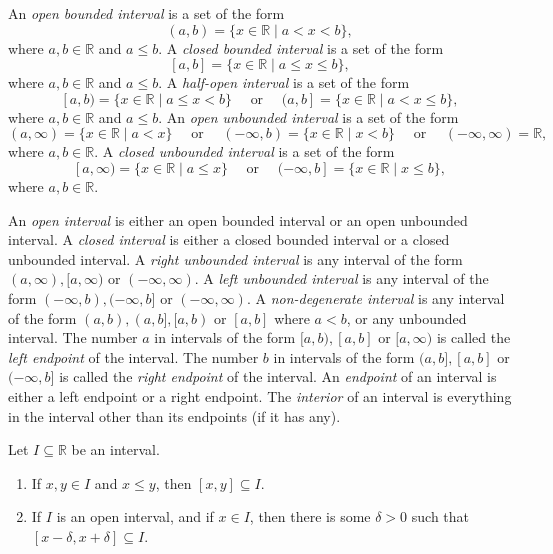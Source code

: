 \begin{definition} %
	An \emph{open bounded interval} is a set of the form
	$$
		(a, b) = \{ x \in \mathbb{R} \mid a < x < b \},
	$$
	where $a, b \in \mathbb{R}$ and $a \leq b$. A \emph{closed bounded interval} is a set of the form
	$$
		[a, b] = \{ x \in \mathbb{R} \mid a \leq x \leq b \},
	$$
	where $a, b \in \mathbb{R}$ and $a \leq b$. A \emph{half-open interval} is a set of the form
	$$
		[a, b) = \{ x \in \mathbb{R} \mid a \leq x < b \} \quad \text { or } \quad (a, b] = \{ x \in \mathbb{R} \mid a < x \leq b \},
	$$
	where $a, b \in \mathbb{R}$ and $a \leq b$. An \emph{open unbounded interval} is a set of the form
	$$
		(a, \infty) = \{ x \in \mathbb{R} \mid a < x \} \quad \text { or } \quad (-\infty, b) = \{ x \in \mathbb{R} \mid x < b \} \quad \text { or } \quad (-\infty, \infty) = \mathbb{R},
	$$
	where $a, b \in \mathbb{R}$. A \emph{closed unbounded interval} is a set of the form
	$$
		[a, \infty) = \{ x \in \mathbb{R} \mid a \leq x \} \quad \text { or } \quad(-\infty, b] = \{ x \in \mathbb{R} \mid x \leq b \},
	$$
	where $a, b \in \mathbb{R}$.

	An \emph{open interval} is either an open bounded interval or an open unbounded interval. A \emph{closed interval} is either a closed bounded interval or a closed unbounded interval. A \emph{right unbounded interval} is any interval of the form $(a, \infty), [a, \infty)$ or $(-\infty, \infty)$. A \emph{left unbounded interval} is any interval of the form $(-\infty, b), (-\infty, b]$ or $(-\infty, \infty)$. A \emph{non-degenerate interval} is any interval of the form $(a, b), (a, b], [a, b)$ or $[a, b]$ where $a < b$, or any unbounded interval. The number $a$ in intervals of the form $[a, b), [a, b]$ or $[a, \infty)$ is called the \emph{left endpoint} of the interval. The number $b$ in intervals of the form $(a, b], [a, b]$ or $(-\infty, b]$ is called the \emph{right endpoint} of the interval. An \emph{endpoint} of an interval is either a left endpoint or a right endpoint. The \emph{interior} of an interval is everything in the interval other than its endpoints (if it has any).
\end{definition}

\begin{lemma} %
	\label{rpr:l:interval}

	Let $I \subseteq \mathbb{R}$ be an interval.
	\begin{enumerate}
		\item \label{rpr:l:interval:1}
		      If $x, y \in I$ and $x \leq y$, then $[x, y] \subseteq I$.
		\item \label{rpr:l:interval:2}
		      If $I$ is an open interval, and if $x \in I$, then there is some $\delta > 0$ such that $[x - \delta, x + \delta] \subseteq I$.
	\end{enumerate}
\end{lemma}

